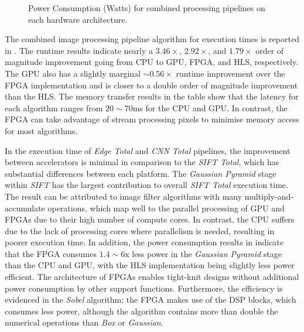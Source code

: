 \begin{figure}[t]
    \centering
\resizebox{\columnwidth}{!}{}    %
    \caption[Combined Algorithm Power Consumption]{Power Consumption (Watts) for combined processing pipelines on each hardware architecture.}
    \label{fig:Energy}
\end{figure}



The combined image processing pipeline algorithm for execution times is reported in . The runtime results indicate nearly a $3.46\times$, $2.92\times$, and $1.79\times$ order of magnitude improvement going from CPU to GPU, FPGA, and HLS, respectively. The GPU also has a slightly marginal $\sim0.56\times$ runtime improvement over the FPGA implementation and is closer to a double order of magnitude improvement than the HLS. The memory transfer results in the table show that the latency for each algorithm ranges from $20\sim70$ms for the CPU and GPU. In contrast, the FPGA can take advantage of stream processing pixels to minimise memory access for most algorithms.


In the execution time of \textit{Edge Total} and \textit{CNN Total} pipelines, the improvement between accelerators is minimal in comparison to the \textit{SIFT Total}, which has substantial differences between each platform. The \textit{Gaussian Pyramid} stage within \textit{SIFT} has the largest contribution to overall \textit{SIFT Total} execution time. The result can be attributed to image filter algorithms with many multiply-and-accumulate operations, which map well to the parallel processing of GPU and FPGAs due to their high number of compute cores. In contrast, the CPU suffers due to the lack of processing cores where parallelism is needed, resulting in poorer execution time. In addition, the power consumption results in  indicate that the FPGA consumes $1.4\sim 6$x less power in the \textit{Gaussian Pyramid} stage than the CPU and GPU, with the HLS implementation being slightly less power efficient. The architecture of FPGAs enables tight-knit designs without additional power consumption by other support functions. Furthermore, the efficiency is evidenced in the \textit{Sobel} algorithm; the FPGA makes use of the DSP blocks, which consumes less power, although the algorithm contains more than double the numerical operations than \textit{Box} or \textit{Gaussian}. 



